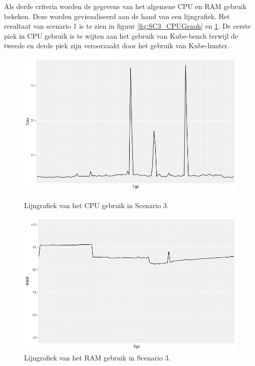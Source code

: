 Als derde criteria worden de gegevens van het algemene CPU en RAM gebruik bekeken. Deze worden gevisualiseerd aan de hand van een lijngrafiek. Het resultaat van scenario 1 is te zien in figuur \ref{fig:SC3_CPUGraph} en \ref{fig:SC3_RAMGraph}. De eerste piek in CPU gebruik is te wijten aan het gebruik van Kube-bench terwijl de tweede en derde piek zijn veroorzaakt door het gebruik van Kube-hunter.
\begin{figure}[h]
	\centering
	\begin{minipage}[h]{0.45\linewidth}
		\includegraphics[width=\linewidth]{img/SC3_CPUGraph.png}
		\caption{Lijngrafiek van het CPU gebruik in Scenario 3.}
		\label{fig:SC3_CPUGraph}
	\end{minipage}
	\quad
	\begin{minipage}[h]{0.45\linewidth}
		\includegraphics[width=\linewidth]{img/SC3_RAMGraph.png}
		\caption{Lijngrafiek van het RAM gebruik in Scenario 3.}
		\label{fig:SC3_RAMGraph}
	\end{minipage}
\end{figure}


